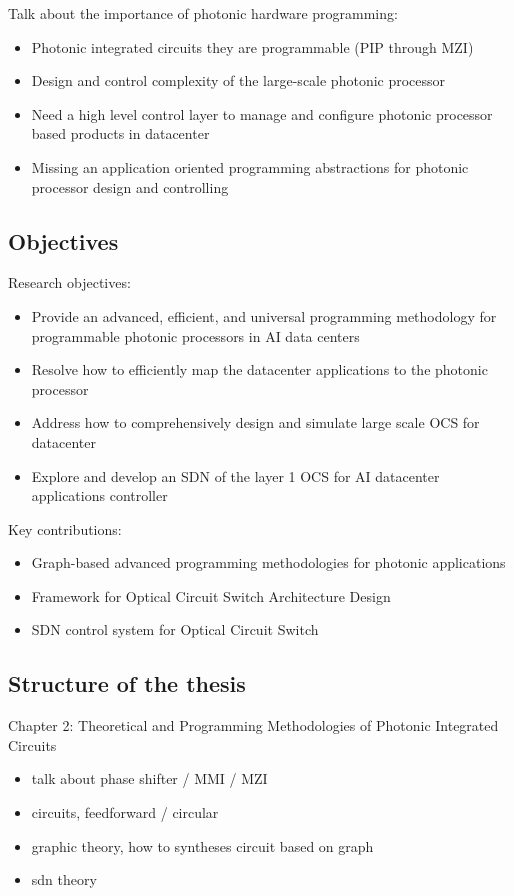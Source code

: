 \documentclass{article}
\begin{document}
Talk about the importance of photonic hardware programming:
\begin{itemize}
    \item Photonic integrated circuits they are programmable (PIP through MZI)
    \item Design and control complexity of the large-scale photonic processor
    \item Need a high level control layer to manage and configure photonic processor based products in datacenter
    \item Missing an application oriented programming abstractions for photonic processor design and controlling
\end{itemize}

\subsection*{Objectives}
Research objectives:
\begin{itemize}
    \item Provide an advanced, efficient, and universal programming methodology for programmable photonic processors in AI data centers
    \item Resolve how to efficiently map the datacenter applications to the photonic processor
    \item Address how to comprehensively design and simulate large scale OCS for datacenter
    \item Explore and develop an SDN of the layer 1 OCS for AI datacenter applications controller
\end{itemize}

Key contributions:
\begin{itemize}
    \item Graph-based advanced programming methodologies for photonic applications
    \item Framework for Optical Circuit Switch Architecture Design
    \item SDN control system for Optical Circuit Switch
\end{itemize}

\subsection*{Structure of the thesis}
Chapter 2: Theoretical and Programming Methodologies of Photonic Integrated Circuits
\begin{itemize}
    \item talk about phase shifter / MMI / MZI
    \item circuits, feedforward / circular
    \item graphic theory, how to syntheses circuit based on graph
    \item sdn theory
\end{itemize}
\end{document}
